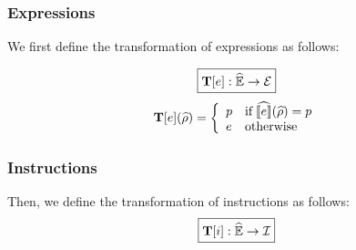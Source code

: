 \documentclass[10pt,conference]{IEEEtran}
\begin{document}
\subsubsection{Expressions} We first define the transformation of expressions as
follows:

\[
  \framebox{$\transform{\expr}: \aenvset \rightarrow \exprset$}
\]
\[
  \textbf{T}[e](\widehat{\rho}) = \left\{
    \begin{array}{ll}
      p & \text{if} \; \widehat{\llbracket{e}\rrbracket}(\widehat{\rho}) = p\\
      e & \text{otherwise}\\
    \end{array}
  \right.
\]

\subsubsection{Instructions} Then, we define the transformation of instructions
as follows:
\[
  \framebox{$\transform{\inst}: \aenvset \rightarrow \instset$}
\]
\end{document}
